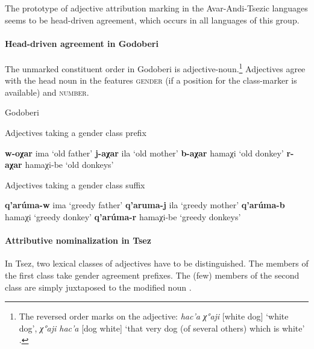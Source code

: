 The prototype of adjective attribution marking in the Avar-Andi-Tsezic languages seems to be head\hyp{}driven agreement, which occurs in all languages of this group.

\paragraph*{Head\hyp{}driven agreement in Godoberi}
The unmarked constituent order in Godoberi is adjective-noun.\footnote{The reversed order marks  on the adjective: \textit{hac'a χ°aji} [white dog] ‘white dog’, \textit{χ°aji hac'a} [dog white] ‘that very dog (of several others) which is white’ \citep[149]{kazenin1996a}.} Adjectives agree with the head noun in the features \textsc{gender} (if a position for the class-marker is available) and \textsc{number}.
\begin{exe}
\ex
\settowidth\jamwidth{[\textsc{n.pl}]}
\rm{Godoberi \citep[25]{tatevosov1996a}}
\begin{xlist}
\ex 
\rm{Adjectives taking a gender class prefix}
\begin{xlist}
\ex \textbf{w-oχar} ima 			\rm{‘old father’}			\jambox{\rm{[\textsc{m}]}}
\ex \textbf{j-aχar} ila				\rm{‘old mother’}		\jambox{\rm{[\textsc{f}]}}
\ex \textbf{b-aχar} hamaχi			\rm{‘old donkey’}		\jambox{\rm{[\textsc{n}]}}
\ex \textbf{r-aχar} hamaχi-be 		\rm{‘old donkeys’}		\jambox{\rm{[\textsc{n.pl}]}}
\end{xlist}

\ex 
\rm{Adjectives taking a gender class suffix}
\begin{xlist}
\ex \textbf{q'arúma-w} ima			\rm{‘greedy father’}		\jambox{\rm{[\textsc{m}]}}
\ex \textbf{q'aruma-j} ila			\rm{‘greedy mother’}		\jambox{\rm{[\textsc{f}]}}
\ex \textbf{q'arúma-b} hamaχi 		\rm{‘greedy donkey’}		\jambox{\rm{[\textsc{n}]}}
\ex \textbf{q'arúma-r} hamaχi-be	\rm{‘greedy donkeys’}	\jambox{\rm{[\textsc{n.pl}]}}
\end{xlist}
\end{xlist}
\end{exe}

\paragraph*{Attributive nominalization in Tsez}
In Tsez, two lexical classes of adjectives have to be distinguished. The members of the first class take gender agreement prefixes. The (few) members of the second class are simply juxtaposed to the modified noun \citep[126]{alekseev-etal2004}.

